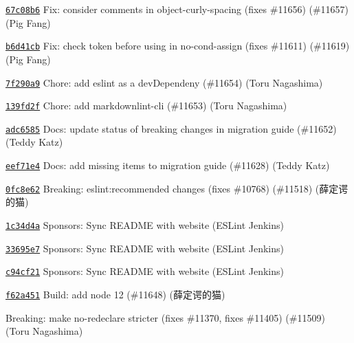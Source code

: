 \begin{DoxyItemize}
\item \href{https://github.com/eslint/eslint/commit/67c08b67509c54acd96aab2cec22efb53bfe6265}{\texttt{ {\ttfamily 67c08b6}}} Fix\+: consider comments in object-\/curly-\/spacing (fixes \#11656) (\#11657) (Pig Fang)
\item \href{https://github.com/eslint/eslint/commit/b6d41cbe28a8b28b1c1d9aa36cb4c349c73f6f1d}{\texttt{ {\ttfamily b6d41cb}}} Fix\+: check token before using in no-\/cond-\/assign (fixes \#11611) (\#11619) (Pig Fang)
\item \href{https://github.com/eslint/eslint/commit/7f290a9044ca795884ac2e495cd31b2a35f109a6}{\texttt{ {\ttfamily 7f290a9}}} Chore\+: add eslint as a dev\+Dependeny (\#11654) (Toru Nagashima)
\item \href{https://github.com/eslint/eslint/commit/139fd2f1254bcc524738f8c2645e0847df95e0d0}{\texttt{ {\ttfamily 139fd2f}}} Chore\+: add markdownlint-\/cli (\#11653) (Toru Nagashima)
\item \href{https://github.com/eslint/eslint/commit/adc6585ce074e03fc8a842e8ebc5b082a0ed0b65}{\texttt{ {\ttfamily adc6585}}} Docs\+: update status of breaking changes in migration guide (\#11652) (Teddy Katz)
\item \href{https://github.com/eslint/eslint/commit/eef71e455e67040168c8df8a6c9c2b4fbe805a50}{\texttt{ {\ttfamily eef71e4}}} Docs\+: add missing items to migration guide (\#11628) (Teddy Katz)
\item \href{https://github.com/eslint/eslint/commit/0fc8e62818bc8d0a0a804b59c6110818844df5f3}{\texttt{ {\ttfamily 0fc8e62}}} Breaking\+: eslint\+:recommended changes (fixes \#10768) (\#11518) (薛定谔的猫)
\item \href{https://github.com/eslint/eslint/commit/1c34d4a6313c399761281282fff3a1bbe5e17b6d}{\texttt{ {\ttfamily 1c34d4a}}} Sponsors\+: Sync README with website (ESLint Jenkins)
\item \href{https://github.com/eslint/eslint/commit/33695e7f7048306ac196eff6e5a16e165ad03090}{\texttt{ {\ttfamily 33695e7}}} Sponsors\+: Sync README with website (ESLint Jenkins)
\item \href{https://github.com/eslint/eslint/commit/c94cf212d31513fde74e0ea88b79e5e0f89a18a4}{\texttt{ {\ttfamily c94cf21}}} Sponsors\+: Sync README with website (ESLint Jenkins)
\item \href{https://github.com/eslint/eslint/commit/f62a4510b007172c7160f007a6ec2aa2c9a80dd7}{\texttt{ {\ttfamily f62a451}}} Build\+: add node 12 (\#11648) (薛定谔的猫)
\item \href{https://github.com/eslint/eslint/commit/20364cc4f7fe0423adce0dd44fb24fc48e1cae4b}{\texttt{ {}}} Breaking\+: make no-\/redeclare stricter (fixes \#11370, fixes \#11405) (\#11509) (Toru Nagashima)

\end{DoxyItemize}
